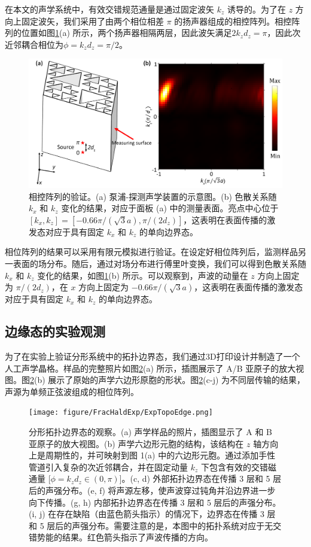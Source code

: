 在本文的声学系统中，有效交错规范通量是通过固定波矢 $k_z$ \quad [$\phi = k_z d_z = \pi/2$] 诱导的。为了在 $z$ 方向上固定波矢，我们采用了由两个相位相差 $\pi$ 的扬声器组成的相控阵列。相控阵列的位置如图\ref{fig:PhaseArray}(a) 所示，两个扬声器相隔两层，因此波矢满足$2k_zd_z=\pi$，因此次近邻耦合相位为$\phi=k_zd_z=\pi/2$。

\begin{figure}[htbp]
    \centering
    \includegraphics[width=0.75\linewidth]{figure/FracHaldExp/PhaseArray.png}
    \caption{相控阵列的验证。(a) 泵浦-探测声学装置的示意图。(b) 色散关系随 $k_x$ 和 $k_z$ 变化的结果，对应于面板 (a) 中的测量表面。亮点中心位于 $[k_x, k_z] = [-0.66\pi/(\sqrt{3} a), \pi/(2d_z)]$，这表明在表面传播的激发态对应于具有固定 $k_x$ 和 $k_z$ 的单向边界态。}
    \label{fig:PhaseArray}
\end{figure}

相位阵列的结果可以采用有限元模拟进行验证。在设定好相位阵列后，监测样品另一表面的场分布。随后，通过对场分布进行傅里叶变换，我们可以得到色散关系随 $k_x$ 和 $k_z$ 变化的结果，如图\ref{fig:PhaseArray}(b) 所示。可以观察到，声波的动量在 $z$ 方向上固定为 $\pi/(2d_z)$，在 $x$ 方向上固定为 $-0.66 \pi/(\sqrt{3} a)$，这表明在表面传播的激发态对应于具有固定 $k_x$ 和 $k_z$ 的单向边界态。

\subsection{边缘态的实验观测}
为了在实验上验证分形系统中的拓扑边界态，我们通过3D打印设计并制造了一个人工声学晶格。样品的完整照片如图\ref{fig:ExpTopoEdge}(a) 所示，插图展示了 A/B 亚原子的放大视图。图\ref{fig:ExpTopoEdge}(b) 展示了原始的声学六边形原胞的形状。图\ref{fig:ExpTopoEdge}(c-j) 为不同层传输的结果，声源为单频正弦波组成的相位阵列。

\begin{figure}[htbp]
    \centering
    \texttt{[image: figure/FracHaldExp/ExpTopoEdge.png]}
    \caption{分形拓扑边界态的观察。(a) 声学样品的照片，插图显示了 A 和 B 亚原子的放大视图。(b) 声学六边形元胞的结构，该结构在 $z$ 轴方向上是周期性的，并可映射到图 1(a) 中的六边形元胞。通过添加手性管道引入复杂的次近邻耦合，并在固定动量 $k_z$ 下包含有效的交错磁通量 [$\phi = k_z d_z \in (0, \pi)$]。(c, d) 外部拓扑边界态在传播 3 层和 5 层后的声强分布。(e, f) 将声源左移，使声波穿过钝角并沿边界进一步向下传播。(g, h) 内部拓扑边界态在传播 3 层和 5 层后的声强分布。(i, j) 在存在缺陷（由蓝色箭头指示）的情况下，边界态在传播 3 层和 5 层后的声强分布。需要注意的是，本图中的拓扑系统对应于无交错势能的结果。红色箭头指示了声波传播的方向。}
    \label{fig:ExpTopoEdge}
\end{figure}

